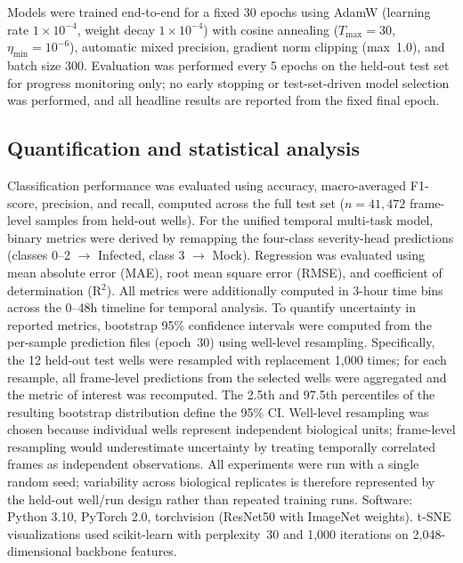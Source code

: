 \documentclass[12pt,letterpaper]{article}
\begin{document}
Models were trained end-to-end for a fixed 30 epochs using AdamW (learning rate $1 \times 10^{-4}$, weight decay $1 \times 10^{-4}$) with cosine annealing ($T_{\max} = 30$, $\eta_{\min} = 10^{-6}$), automatic mixed precision, gradient norm clipping (max~1.0), and batch size 300.
Evaluation was performed every 5 epochs on the held-out test set for progress monitoring only; no early stopping or test-set-driven model selection was performed, and all headline results are reported from the fixed final epoch.

\subsection*{Quantification and statistical analysis}

Classification performance was evaluated using accuracy, macro-averaged F1-score, precision, and recall, computed across the full test set ($n = 41{,}472$ frame-level samples from held-out wells).
For the unified temporal multi-task model, binary metrics were derived by remapping the four-class severity-head predictions (classes 0--2 $\to$ Infected, class 3 $\to$ Mock).
Regression was evaluated using mean absolute error (MAE), root mean square error (RMSE), and coefficient of determination (R$^2$).
All metrics were additionally computed in 3-hour time bins across the 0--48h timeline for temporal analysis.
To quantify uncertainty in reported metrics, bootstrap 95\% confidence intervals were computed from the per-sample prediction files (epoch~30) using well-level resampling.
Specifically, the 12 held-out test wells were resampled with replacement 1,000 times; for each resample, all frame-level predictions from the selected wells were aggregated and the metric of interest was recomputed.
The 2.5th and 97.5th percentiles of the resulting bootstrap distribution define the 95\% CI.
Well-level resampling was chosen because individual wells represent independent biological units; frame-level resampling would underestimate uncertainty by treating temporally correlated frames as independent observations.
All experiments were run with a single random seed; variability across biological replicates is therefore represented by the held-out well/run design rather than repeated training runs.
Software: Python 3.10, PyTorch 2.0, torchvision (ResNet50 with ImageNet weights).
t-SNE visualizations\cite{ref-vandermaaten2008tsne} used scikit-learn\cite{ref-pedregosa2011sklearn} with perplexity~30 and 1,000 iterations on 2,048-dimensional backbone features.
\end{document}
